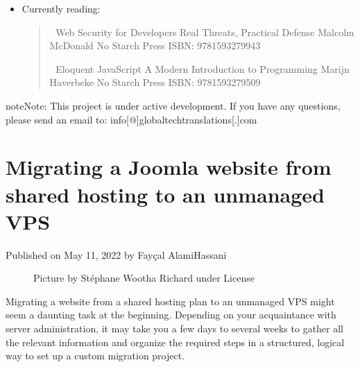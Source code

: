 \documentclass[a4paper,10pt,english,openany,oneside]{sphinxmanual}
\begin{document}
\begin{sloppypar}
\begin{itemize}
\item {} 
\sphinxAtStartPar
Currently reading:
\begin{quote}

\sphinxAtStartPar
📕 Web Security for Developers \sphinxhyphen{} Real Threats, Practical Defense \sphinxhyphen{} Malcolm McDonald \sphinxhyphen{} No Starch Press \sphinxhyphen{} ISBN: 978\sphinxhyphen{}1\sphinxhyphen{}59327\sphinxhyphen{}994\sphinxhyphen{}3

\sphinxAtStartPar
📕 Eloquent JavaScript \sphinxhyphen{} A Modern Introduction to Programming \sphinxhyphen{} Marijn Haverbeke \sphinxhyphen{} No Starch Press \sphinxhyphen{} ISBN: 978\sphinxhyphen{}1\sphinxhyphen{}59327950\sphinxhyphen{}9
\end{quote}

\end{itemize}

\begin{sphinxadmonition}{note}{Note:}
\sphinxAtStartPar
This project is under active development. If you have any questions, please send an email to: info{[}@{]}globaltech\sphinxhyphen{}translations{[}.{]}com \sphinxhyphen{} 
\end{sphinxadmonition}

\sphinxstepscope


\chapter{Migrating a Joomla website from shared hosting to an unmanaged VPS}
\label{\detokenize{joomla-to-vps:migrating-a-joomla-website-from-shared-hosting-to-an-unmanaged-vps}}\label{\detokenize{joomla-to-vps::doc}}
\sphinxAtStartPar
Published on May 11, 2022 by Fayçal Alami\sphinxhyphen{}Hassani %
\begin{footnote}[5]\sphinxAtStartFootnote
{}
%
\end{footnote}

\begin{figure}[H]
\centering
\capstart

\noindent{}
\caption{Picture by Stéphane Wootha Richard under \sphinxfootnotemark[6] License}\label{\detokenize{joomla-to-vps:id1}}\end{figure}
%
\begin{footnotetext}[6]\label{\thesphinxscope.6}%
\sphinxAtStartFootnote
{}
%
\end{footnotetext}\ignorespaces 
\sphinxAtStartPar
Migrating a website from a shared hosting plan to an unmanaged VPS might seem a daunting task at the beginning. Depending on your acquaintance with server administration, it may take you a few days to several weeks to gather all the relevant information and organize the required steps in a structured, logical way to set up a custom migration project.


\end{sloppypar}
\end{document}
